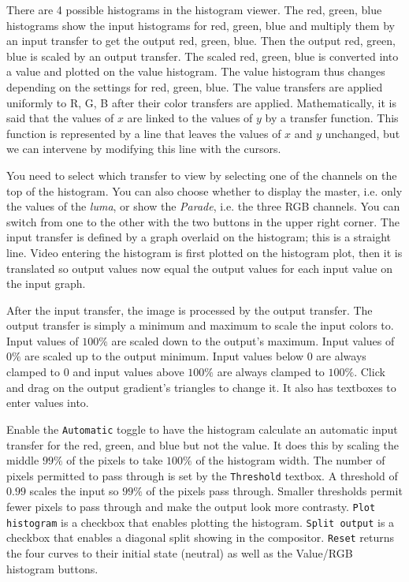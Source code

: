 There are 4 possible histograms in the histogram viewer. The red, green, blue histograms show the input histograms for red, green, blue and multiply them by an input transfer to get the output red, green, blue. Then the output red, green, blue is scaled by an output transfer. The scaled red, green, blue is converted into a value and plotted on the value histogram. The value histogram thus changes depending on the settings for red, green, blue. The value transfers are applied uniformly to R, G, B after their color transfers are applied. Mathematically, it is said that the values of $x$ are linked to the values of $y$ by a transfer function. This function is represented by a line that leaves the values of $x$ and $y$ unchanged, but we can intervene by modifying this line with the cursors. 

You need to select which transfer to view by selecting one of the channels on the top of the histogram. You can also choose whether to display the master, i.e. only the values of the \textit{luma}, or show the \textit{Parade}, i.e. the three RGB channels. You can switch from one to the other with the two buttons in the upper right corner. The input transfer is defined by a graph overlaid on the histogram; this is a straight line. Video entering the histogram is first plotted on the histogram plot, then it is translated so output values now equal the output values for each input value on the input graph.

After the input transfer, the image is processed by the output transfer. The output transfer is simply a minimum and maximum to scale the input colors to. Input values of $100\%$ are scaled down to the output's maximum. Input values of $0\%$ are scaled up to the output minimum. Input values below $0$ are always clamped to $0$ and input values above $100\%$ are always clamped to $100\%$. Click and drag on the output gradient's triangles to change it. It also has textboxes to enter values into.

Enable the \texttt{Automatic} toggle to have the histogram calculate an automatic input transfer for the red, green, and blue but not the value. It does this by scaling the middle $99\%$ of the pixels to take $100\%$ of the histogram width. The number of pixels permitted to pass through is set by the \texttt{Threshold} textbox. A threshold of $0.99$ scales the input so $99\%$ of the pixels pass through. Smaller thresholds permit fewer pixels to pass through and make the output look more contrasty.
\texttt{Plot histogram} is a checkbox that enables plotting the histogram.
\texttt{Split output} is a checkbox that enables a diagonal split showing in the compositor. 
\texttt{Reset} returns the four curves to their initial state (neutral) as well as the Value/RGB histogram buttons.

